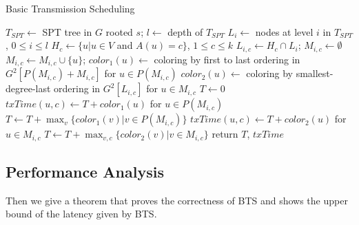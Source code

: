 \documentclass[10pt, conference]{IEEEtran}
\begin{document}
\begin{algorithm}[tbp] \label{A1}
\caption{Basic Transmission Scheduling}
$T_{SPT} \leftarrow$ SPT tree in $G$ rooted $s$; $l \leftarrow$ depth of $T_{SPT}$\;
$L_i \leftarrow$ nodes at level $i$ in $T_{SPT}$, $0 \leq i \leq l$\;
$H_c \leftarrow \{u | u \in V$ and $A(u) = c\}$, $1 \leq c \leq k$\;
{
 {
    $L_{i,c} \leftarrow H_c \cap L_i$; $M_{i,c} \leftarrow \emptyset$\;
    {
        {
            $M_{i,c} \leftarrow M_{i,c} \cup \{u\}$;
        }
    }
    $color_1(u) \leftarrow$ coloring by first to last ordering in $G^2[P(M_{i,c})+M_{i,c}]$ for $u \in P(M_{i,c})$\;
    $color_2(u) \leftarrow $ coloring by smallest-degree-last ordering in $G^2[L_{i,c}]$ for $u
\in M_{i,c}$\;
 }
}
$T \leftarrow 0$\;
{
 {
    $txTime(u, c) \leftarrow T + color_1(u)$  for $u \in
P(M_{i,c})$\;
    $T \leftarrow T + \max_v \{color_1(v) | v \in P(M_{i,c})\}$\;
 }
 {
    $txTime(u, c) \leftarrow T + color_2(u)$  for $u \in M_{i,c}$\;
 }
 $T \leftarrow T + \max_{v,c} \{color_2(v) | v \in M_{i,c}\}$\;
}
return $T$, $txTime$\;
\end{algorithm}


\subsection{Performance Analysis}

Then we give a theorem that proves the correctness of BTS and
shows the upper bound of the latency given by BTS.
\end{document}
